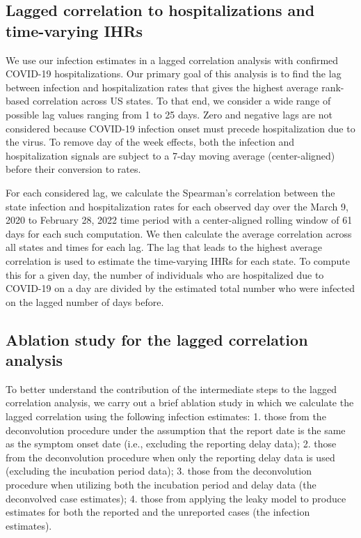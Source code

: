 \documentclass{article}
\begin{document}
\subsection{Lagged correlation to hospitalizations and time-varying IHRs} 

We use our infection estimates in a lagged correlation analysis with
confirmed COVID-19 hospitalizations. Our primary goal of this analysis is to
find the lag between infection and hospitalization rates that gives the highest
average rank-based correlation across US states. To that end, we consider a wide
range of possible lag values ranging from 1 to 25 days. Zero and negative
lags are not considered because COVID-19 infection onset must precede
hospitalization due to the virus. To remove day of the week effects, both the
infection and hospitalization signals are subject to a 7-day moving
average (center-aligned) before their conversion to rates.

For each considered lag, we calculate the Spearman's correlation between the 
state infection and hospitalization rates for each observed day 
over the March 9, 2020 to February 28, 2022
time period%
with a center-aligned rolling window of 61 days for each such computation.
We then calculate the average correlation across all states and times for each lag. 
The lag that leads to the highest average correlation is used to estimate 
the time-varying IHRs for each
state. To compute this for a given day, the number of individuals who are
hospitalized due to COVID-19 on a day are divided by the estimated total number
who were infected on the lagged number of days before.

\subsection{Ablation study for the lagged correlation analysis} 

To better understand the contribution of the intermediate steps to the lagged 
correlation analysis, we carry out a brief ablation study in which we calculate the 
lagged correlation using the following infection estimates: 1. those from the
deconvolution procedure under the assumption that the report date is the 
same as the symptom onset date (i.e., excluding
the reporting delay data); 2. those from the deconvolution procedure when only the
reporting delay data is used (excluding the incubation period data); 3. those from
the deconvolution procedure when utilizing both the incubation period and delay data 
(the deconvolved case estimates); 4. those from applying the leaky model to produce
estimates for both the reported and the unreported cases (the infection estimates).
\end{document}
